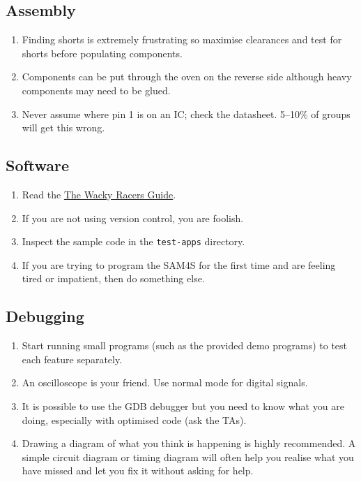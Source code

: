 \documentclass[11pt, a4paper]{article}
\newcommand{\code}[1]{\texttt{#1}}
\newcommand{\theguide}{\href{https://eng-git.canterbury.ac.nz/wacky-racers/wacky-racers/-/blob/master/doc/guide/guide.pdf}{The Wacky Racers Guide}}
\begin{document}
\subsection{Assembly}

\begin{enumerate}
\item Finding shorts is extremely frustrating so maximise clearances
  and test for shorts before populating components.

\item Components can be put through the oven on the reverse side
  although heavy components may need to be glued.

\item Never assume where pin 1 is on an IC; check the datasheet.
  5--10\% of groups will get this wrong.

\end{enumerate}


\subsection{Software}

\begin{enumerate}
\item Read the \theguide.

\item If you are not using version control, you are foolish.

\item Inspect the sample code in the \code{test-apps} directory.

\item If you are trying to program the SAM4S for the first time and
  are feeling tired or impatient, then do something else.
\end{enumerate}


\subsection{Debugging}

\begin{enumerate}
\item Start running small programs (such as the provided demo
  programs) to test each feature separately.

\item An oscilloscope is your friend.  Use normal mode for digital
  signals.

\item It is possible to use the GDB debugger but you need to know what
  you are doing, especially with optimised code (ask the TAs).

\item Drawing a diagram of what you think is happening is highly
  recommended. A simple circuit diagram or timing diagram will often
  help you realise what you have missed and let you fix it without
  asking for help.

\end{enumerate}
\end{document}
